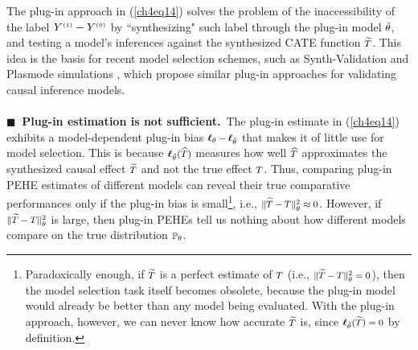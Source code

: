 \documentclass [PhD] {uclathes}
\begin{document}
The plug-in approach in (\ref{ch4eq14}) solves the problem of the inaccessibility of the label \mbox{\footnotesize $Y^{\mbox{\tiny $(1)$}}-Y^{\mbox{\tiny $(0)$}}$} by ``synthesizing" such label through the plug-in model $\mbox{\footnotesize $\tilde{\theta}$}$, and testing a model's inferences against the synthesized CATE function $\mbox{\footnotesize $\widetilde{T}$}$. This idea is the basis for recent model selection schemes, such as Synth-Validation \cite{schuler2017synth} and Plasmode simulations \cite{franklin2014plasmode}, which propose similar plug-in approaches for validating causal inference models.\\ 
\\
{\bf \mbox{\tiny $\blacksquare$}\, Plug-in estimation is not sufficient.}\, The plug-in estimate in (\ref{ch4eq14}) exhibits a model-dependent plug-in bias $\mbox{\footnotesize $\boldsymbol{\ell}_{\theta}-\boldsymbol{\ell}_{\tilde{\theta}}$}$ that makes it of little use for model selection. This is because $\mbox{\footnotesize $\boldsymbol{\ell}_{\tilde{\theta}}(\widehat{T})$}$ measures how well $\mbox{\footnotesize $\widehat{T}$}$ approximates the synthesized causal effect $\mbox{\footnotesize $\widetilde{T}$}$ and not the true effect $\mbox{\footnotesize $T$}$. Thus, comparing plug-in PEHE estimates of different models can reveal their true comparative performances only if the plug-in bias is small\footnote{Paradoxically enough, if $\mbox{\footnotesize $\widetilde{T}$}$ is a perfect estimate of $\mbox{\footnotesize $T$}$ (i.e., $\mbox{\footnotesize $\|\widetilde{T}-T\|^2_{\theta} = 0$}$), then the model selection task itself becomes obsolete, because the plug-in model would already be better than any model being evaluated. With the plug-in approach, however, we can never know how accurate $\mbox{\footnotesize $\widetilde{T}$}$ is, since $\mbox{\footnotesize $\boldsymbol{\ell}_{\tilde{\theta}}(\widetilde{T}) = 0$}$ by definition.}, i.e., $\mbox{\footnotesize $\|\widetilde{T}-T\|^2_{\theta} \approx 0$}$. However, if $\mbox{\footnotesize $\|\widetilde{T}-T\|^2_{\theta}$}$ is large, then plug-in PEHEs tell us nothing about how different models compare on the true distribution $\mbox{\footnotesize $\mathbb{P}_{\theta}$}$.   
\end{document}
